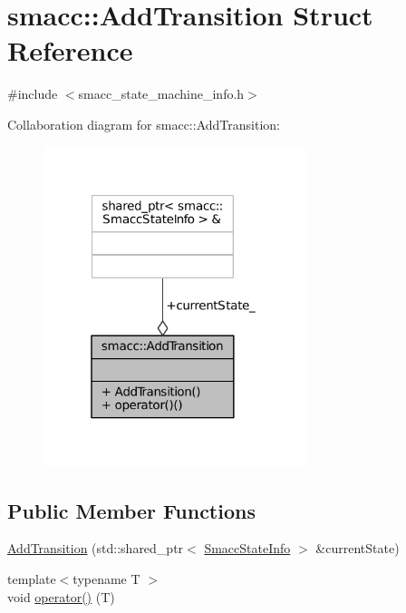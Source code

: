 \hypertarget{structsmacc_1_1AddTransition}{}\section{smacc\+:\+:Add\+Transition Struct Reference}
\label{structsmacc_1_1AddTransition}


{\ttfamily \#include $<$smacc\+\_\+state\+\_\+machine\+\_\+info.\+h$>$}



Collaboration diagram for smacc\+:\+:Add\+Transition\+:
\nopagebreak
\begin{figure}[H]
\begin{center}
\leavevmode
\includegraphics[width=217pt]{structsmacc_1_1AddTransition__coll__graph}
\end{center}
\end{figure}
\subsection*{Public Member Functions}
\begin{DoxyCompactItemize}
\item 
\hyperlink{structsmacc_1_1AddTransition_aaca309ef77d327ac3ac9c45af7d9b902}{Add\+Transition} (std\+::shared\+\_\+ptr$<$ \hyperlink{classsmacc_1_1SmaccStateInfo}{Smacc\+State\+Info} $>$ \&current\+State)
\item 
{\footnotesize template$<$typename T $>$ }\\void \hyperlink{structsmacc_1_1AddTransition_a4d4ece2e48045d830fc924b094522d36}{operator()} (T)
\end{DoxyCompactItemize}
